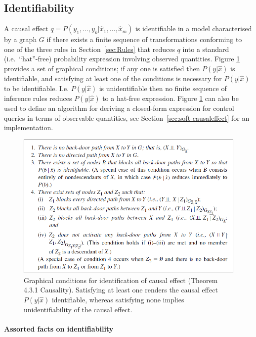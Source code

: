 \documentclass[11pt]{article}
\numberwithin{equation}{section}
\begin{document}
\subsection{Identifiability}
A causal effect $q = P(y_1, \dots, y_k| \hat{x}_1, \dots, \hat{x}_m)$ is identifiable in a model characterised by a graph $G$ if there exists a finite sequence of transformations conforming to one of the three rules in Section~\ref{sec:Rules} that reduces $q$ into a standard (i.e.\ ``hat''-free) probability expression involving observed quantities. Figure \ref{Fig:graph_cond_ci} provides a set of graphical conditions; if any one is satisfied then $P(y|\hat{x})$ is identifiable, and satisfying at least one of the conditions is necessary for $P(y|\hat{x})$ to be identifiable. I.e. $P(y|\hat{x})$ is unidentifiable then no finite sequence of inference rules reduces $P(y|\hat{x})$ to a hat-free expression. Figure \ref{Fig:graph_cond_ci} can also be used to define an algorithm for deriving a closed-form expression for control queries in terms of observable quantities, see Section~\ref{sec:soft-causaleffect} for an implementation.


\begin{figure}
\begin{center}
\includegraphics[width=0.8\columnwidth]{figures/graph-cond-ident-4-3-1.png}  
\end{center}
\caption{Graphical conditions for identification of causal effect (Theorem 4.3.1 Causality). Satisfying at least one renders the causal effect $P(y|\hat{x})$ identifiable, whereas satisfying none implies unidentifiability of the causal effect.}
\label{Fig:graph_cond_ci}
\end{figure}

\paragraph{Assorted facts on identifiability} 
\end{document}
